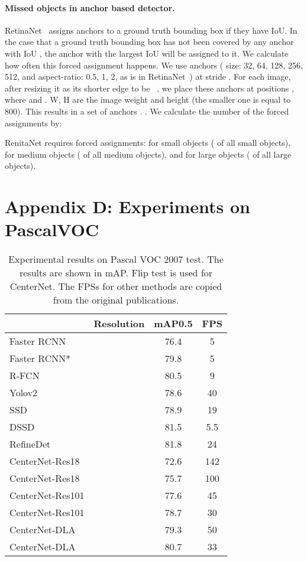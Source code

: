 \documentclass[10pt,twocolumn,letterpaper]{article}
\begin{document}
\paragraph{Missed objects in anchor based detector.}
RetinaNet~\cite{lin2018focal} assigns anchors to a ground truth bounding box if they have  IoU.
In the case that a ground truth bounding box has not been covered by any anchor with IoU , the anchor with the largest IoU will be assigned to it. 
We calculate how often this forced assignment happens.
We use  anchors ( size: 32, 64, 128, 256, 512, and  aspect-ratio: 0.5, 1, 2,  as is in RetinaNet~\cite{lin2018focal}) at stride .
For each image, after resizing it as its shorter edge to be ~\cite{lin2018focal}, we place these anchors at positions , where  and . W, H are the image weight and height (the smaller one is equal to 800).
This results in a set of anchors . .
We calculate the number of the forced assignments by:

RenitaNet requires  forced assignments:  for small objects ( of all small objects),  for medium objects ( of all medium objects), and  for large objects ( of all large objects).

\section*{Appendix D: Experiments on PascalVOC}

\begin{table}[t]
\centering
\begin{tabular}{l c c c}
\hline
 & Resolution  & mAP0.5 & FPS \\
 \hline
 Faster RCNN~\cite{ren2015faster} &  & 76.4 & 5 \\
 Faster RCNN*~\cite{chen17implementation} &   & 79.8 & 5 \\
R-FCN~\cite{dai2016r} &   & 80.5 & 9 \\
 Yolov2~\cite{redmon2017yolo9000} &  & 78.6 & 40 \\
 SSD~\cite{fu2017dssd} &  & 78.9 & 19 \\
 DSSD~\cite{fu2017dssd} &  & 81.5 & 5.5 \\
 RefineDet~\cite{zhang2018single} &  & 81.8 & 24 \\
\hline
CenterNet-Res18 &  & 72.6 & 142\\
CenterNet-Res18 &  & 75.7 &  100\\
CenterNet-Res101 & & 77.6 & 45\\ 
CenterNet-Res101 &   & 78.7 & 30\\
CenterNet-DLA  & & 79.3 & 50\\
CenterNet-DLA &   & 80.7& 33\\
\hline
\end{tabular}
\caption{Experimental results on Pascal VOC 2007 test. The results are shown in mAP. Flip test is used for CenterNet. The FPSs for other methods are copied from the original publications.}
\label{tab:pascal}
\end{table}
\end{document}

